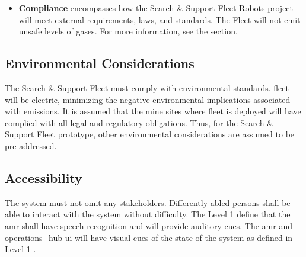 \begin{itemize}
    \item \textbf{Compliance} encompasses how the Search \& Support Fleet Robots project will meet external requirements, laws, and standards. The Fleet will not emit unsafe levels of gases. For more information, see the  section.
\end{itemize}

\subsection{Environmental Considerations}

The Search \& Support Fleet must comply with environmental standards. \gls{fleet} will be electric, minimizing the negative environmental implications associated with emissions. It is assumed that the mine sites where \gls{fleet} is deployed will have complied with all legal and regulatory obligations. Thus, for the Search \& Support Fleet prototype, other environmental considerations are assumed to be pre-addressed.

\subsection{Accessibility}

The system must not omit any stakeholders. Differently abled persons shall be able to interact with the system without difficulty. The Level 1  define that the \gls{amr} shall have speech recognition and will provide auditory cues. The \gls{amr} and \gls{operations_hub} \gls{ui} will have visual cues of the state of the system as defined in Level 1 .
